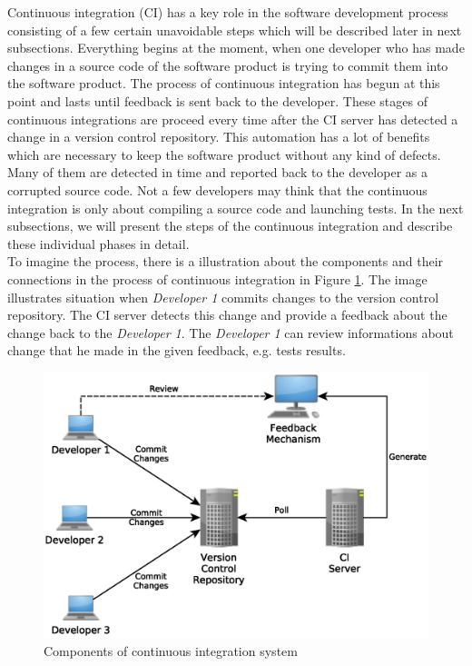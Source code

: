 Continuous integration (CI) has a key role in the software development process consisting of a few certain unavoidable steps which will be described later in next subsections. Everything begins at the moment, when one developer who has made changes in a source code of the software product is trying to commit them into the software product. The process of continuous integration has begun at this point and lasts until feedback is sent back to the developer. These stages of continuous integrations are proceed every time after the CI server has detected a change in a version control repository. This automation has a lot of benefits which are necessary to keep the software product without any kind of defects. Many of them are detected in time and reported back to the developer as a corrupted source code. Not a few developers may think that the continuous integration is only about compiling a source code and launching tests. In the next subsections, we will present the steps of the continuous integration and describe these individual phases in detail.\\

To imagine the process, there is a illustration about the components and their connections in the process of continuous integration in Figure \ref{fig:cocis}. The image illustrates situation when \textit{Developer 1} commits changes to the version control repository. The CI server detects this change and provide a feedback about the change back to the \textit{Developer 1}. The \textit{Developer 1} can review informations about change that he made in the given feedback, e.g. tests results.

\begin{figure}[H]
	\centering
	\includegraphics[scale=0.6]{yEd/components_of_CI_system.eps}
	\caption{Components of continuous integration system\cite{CIPD}}
	\label{fig:cocis}
\end{figure}

